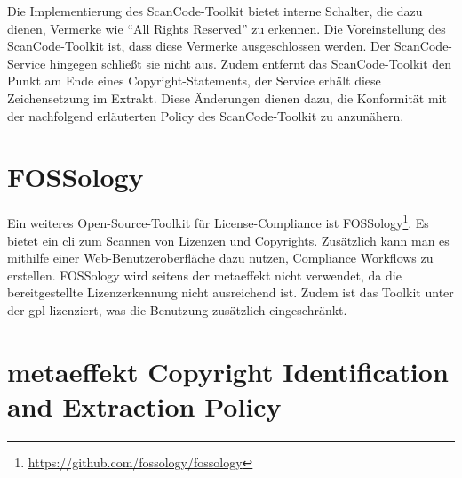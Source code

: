 Die Implementierung des ScanCode-Toolkit bietet interne Schalter, die dazu dienen, Vermerke wie \enquote{All Rights Reserved} zu erkennen.
Die Voreinstellung des ScanCode-Toolkit ist, dass diese Vermerke ausgeschlossen werden.
Der ScanCode-Service hingegen schließt sie nicht aus.
Zudem entfernt das ScanCode-Toolkit den Punkt am Ende eines Copyright-Statements, der Service erhält diese Zeichensetzung im Extrakt\autocite{noauthor_metaeffekt-scancode-service_2025}.
Diese Änderungen dienen dazu, die Konformität mit der nachfolgend erläuterten Policy des ScanCode-Toolkit zu anzunähern.


\section{FOSSology}\label{sec:fossology}

Ein weiteres Open-Source-Toolkit für License-Compliance ist FOSSology\footnote{\url{https://github.com/fossology/fossology}}.
Es bietet ein \gls{cli} zum Scannen von Lizenzen und Copyrights.
Zusätzlich kann man es mithilfe einer Web-Benutzeroberfläche dazu nutzen, Compliance Workflows zu erstellen.
FOSSology wird seitens der metaeffekt nicht verwendet, da die bereitgestellte Lizenzerkennung nicht ausreichend ist.
Zudem ist das Toolkit unter der \gls{gpl} lizenziert, was die Benutzung zusätzlich eingeschränkt.


\section{metaeffekt Copyright Identification and Extraction Policy}\label{sec:policy}

